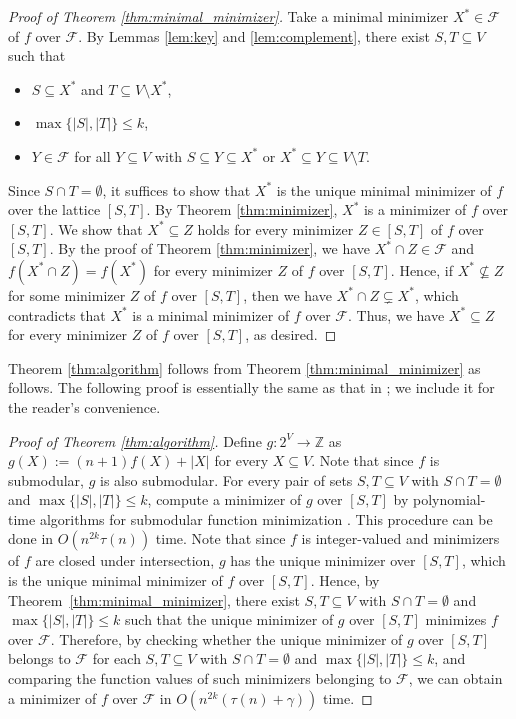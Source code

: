 \documentclass[11pt,letterpaper]{article}
\theoremstyle{plain}
\theoremstyle{definition}
\begin{document}
\begin{proof}[Proof of Theorem \ref{thm:minimal_minimizer}]
Take a minimal minimizer $X^*\in \mathcal{F}$ of $f$ over $\mathcal{F}$.
By Lemmas \ref{lem:key} and \ref{lem:complement}, there exist $S,T\subseteq V$ such that
\begin{itemize}
    \item $S\subseteq X^*$ and $T\subseteq V\setminus X^*$,
    \item $\max\{|S|,|T|\}\le k$,
    \item $Y\in \mathcal{F}$ for all $Y\subseteq V$ with $S\subseteq Y\subseteq X^*$ or $X^*\subseteq Y\subseteq V\setminus T$.
\end{itemize}
Since $S\cap T=\emptyset$, it suffices to show that $X^*$ is the unique minimal minimizer of $f$ over the lattice $[S,T]$.
By Theorem \ref{thm:minimizer}, $X^*$ is a minimizer of $f$ over $[S,T]$.
We show that $X^*\subseteq Z$ holds for every minimizer $Z\in [S,T]$ of $f$ over $[S,T]$.
By the proof of Theorem \ref{thm:minimizer}, we have $X^*\cap Z\in \mathcal{F}$ and $f(X^*\cap Z)=f(X^*)$ for every minimizer $Z$ of $f$ over $[S,T]$.
Hence, if $X^*\not\subseteq Z$ for some minimizer $Z$ of $f$ over $[S,T]$, then we have $X^*\cap Z\subsetneq X^*$, which contradicts that $X^*$ is a minimal minimizer of $f$ over $\mathcal{F}$.
Thus, we have $X^*\subseteq Z$ for every minimizer $Z$ of $f$ over $[S,T]$, as desired.
\end{proof}

Theorem \ref{thm:algorithm} follows from Theorem \ref{thm:minimal_minimizer} as follows.
The following proof is essentially the same as that in \cite{nagele2019}; we include it for the reader’s convenience.
\begin{proof}[Proof of Theorem \ref{thm:algorithm}]
Define $g:2^V\to \mathbb{Z}$ as $g(X):=(n+1)f(X)+|X|$ for every $X\subseteq V$.
Note that since $f$ is submodular, $g$ is also submodular.
For every pair of sets $S,T\subseteq V$ with $S\cap T=\emptyset$ and $\max\{|S|,|T|\}\le k$, compute a minimizer of $g$ over $[S,T]$ by polynomial-time algorithms for submodular function minimization \cite{grotschel1981,iwata2001,schrijver2000}.
This procedure can be done in $O(n^{2k}\tau (n))$ time.
Note that since $f$ is integer-valued and minimizers of $f$ are closed under intersection, $g$ has the unique minimizer over $[S,T]$, which is the unique minimal minimizer of $f$ over $[S,T]$.
Hence, by Theorem~\ref{thm:minimal_minimizer}, there exist $S,T\subseteq V$ with $S\cap T=\emptyset$ and $\max\{|S|,|T|\}\le k$ such that the unique minimizer of $g$ over $[S,T]$ minimizes $f$ over $\mathcal{F}$.
Therefore, by checking whether the unique minimizer of $g$ over $[S,T]$ belongs to $\mathcal{F}$ for each $S,T\subseteq V$ with $S\cap T=\emptyset$ and $\max\{|S|,|T|\}\le k$, and comparing the function values of such minimizers belonging to $\mathcal{F}$, we can obtain a minimizer of $f$ over $\mathcal{F}$ in $O(n^{2k}(\tau (n)+\gamma))$ time.
\end{proof}
\end{document}
